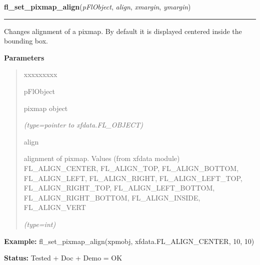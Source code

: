 \hspace{.8\funcindent}\begin{boxedminipage}{\funcwidth}

    \raggedright \textbf{fl\_set\_pixmap\_align}(\textit{pFlObject}, \textit{align}, \textit{xmargin}, \textit{ymargin})

    \vspace{-1.5ex}

    \rule{\textwidth}{0.5\fboxrule}
\setlength{\parskip}{2ex}
    Changes alignment of a pixmap. By default it is displayed centered 
    inside the bounding box.

\setlength{\parskip}{1ex}
      \textbf{Parameters}
      \vspace{-1ex}

      \begin{quote}
        \begin{Ventry}{xxxxxxxxx}

          \item[pFlObject]

          pixmap object

            {\it (type=pointer to xfdata.FL\_OBJECT)}

          \item[align]

          alignment of pixmap. Values (from xfdata module) 
          FL\_ALIGN\_CENTER, FL\_ALIGN\_TOP, FL\_ALIGN\_BOTTOM, 
          FL\_ALIGN\_LEFT, FL\_ALIGN\_RIGHT, FL\_ALIGN\_LEFT\_TOP, 
          FL\_ALIGN\_RIGHT\_TOP, FL\_ALIGN\_LEFT\_BOTTOM, 
          FL\_ALIGN\_RIGHT\_BOTTOM, FL\_ALIGN\_INSIDE, FL\_ALIGN\_VERT

            {\it (type=int)}

        \end{Ventry}

      \end{quote}

\textbf{Example:} fl\_set\_pixmap\_align(xpmobj, xfdata.FL\_ALIGN\_CENTER, 10, 10)



\textbf{Status:} Tested + Doc + Demo = OK



    \end{boxedminipage}

    \label{xformslib:flbitmap:fl_set_pixmap_align}

